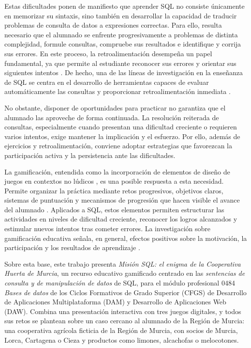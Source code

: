 \documentclass[11pt,a4paper]{article}
\begin{document}
Estas dificultades ponen de manifiesto que aprender SQL no consiste
únicamente en memorizar su sintaxis, sino también en desarrollar la
capacidad de traducir problemas de consulta de datos a expresiones
correctas. Para ello, resulta necesario que el alumnado se enfrente
progresivamente a problemas de distinta complejidad, formule consultas,
compruebe sus resultados e identifique y corrija sus errores. En este
proceso, la retroalimentación desempeña un papel fundamental, ya que
permite al estudiante reconocer sus errores y orientar sus siguientes
intentos \cite{hattie2007}. De hecho, una de las líneas de investigación
en la enseñanza de SQL se centra en el desarrollo de herramientas
capaces de evaluar automáticamente las consultas y proporcionar
retroalimentación inmediata \cite{taipalus2020}.

No obstante, disponer de oportunidades para practicar no garantiza que el alumnado las
aproveche de forma continuada. La resolución reiterada de consultas, especialmente cuando
presentan una dificultad creciente o requieren varios intentos, exige mantener la implicación
y el esfuerzo. Por ello, además de ejercicios y retroalimentación, conviene adoptar
estrategias que favorezcan la participación activa y la persistencia ante las dificultades.

La gamificación, entendida como la incorporación de elementos de diseño de juegos en
contextos no lúdicos \cite{deterding2011}, es una posible respuesta a esta necesidad. Permite
organizar la práctica mediante retos progresivos, objetivos claros, sistemas de puntuación y
mecanismos de progresión que hacen visible el avance del alumnado \cite{kapp2012,werbach2012}.
Aplicados a SQL, estos elementos permiten estructurar las actividades en niveles de dificultad
creciente, reconocer los logros alcanzados y estimular nuevos intentos tras cometer errores. La
investigación sobre gamificación educativa señala, en general, efectos positivos sobre la
motivación, la participación y los resultados de aprendizaje \cite{hamari2014,dicheva2015,sailer2020}.

Sobre esta base, este trabajo presenta \emph{Misión SQL: el enigma de la Cooperativa Huerta de Murcia}, 
un recurso educativo gamificado
centrado en las \emph{sentencias de consulta y de manipulación de datos} de SQL, para el
módulo profesional 0484 \emph{Bases de datos} de los Ciclos Formativos de
Grado Superior (CFGS) de Desarrollo de Aplicaciones Multiplataforma (DAM) y
Desarrollo de Aplicaciones Web (DAW). Combina una presentación
interactiva con tres juegos digitales, y todos sus retos se plantean sobre un caso cercano al
alumnado de la Región de Murcia: una cooperativa agrícola ficticia de la Región de Murcia, con socios de Murcia,
Lorca, Cartagena o Cieza y productos como limones, alcachofas o melocotones. 
\end{document}
